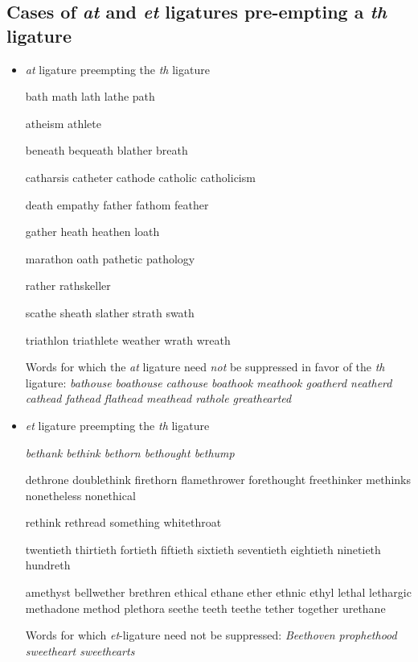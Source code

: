 \subsection*{Cases of \emph{at} and \emph{et} ligatures pre-empting a \emph{th} ligature}

\begin{itemize}
\item \emph{at} ligature preempting the \emph{th} ligature

\bgroup \em

bath math lath lathe path 

atheism athlete 

beneath bequeath blather breath 

catharsis catheter cathode catholic catholicism

death empathy father fathom feather 

gather heath heathen loath

marathon oath pathetic pathology

rather rathskeller

scathe sheath slather strath swath 

triathlon triathlete weather wrath wreath 

\egroup
\medskip
Words for which the \emph{at} ligature need \emph{not} be suppressed in favor of the \emph{th} ligature:
\emph{bathouse boathouse cathouse boathook meathook goatherd neatherd cathead fathead flathead meathead rathole greathearted}



\item \emph{et} ligature preempting the \emph{th} ligature

\bgroup \em
bethank bethink bethorn bethought bethump 

dethrone doublethink firethorn flamethrower forethought freethinker methinks nonetheless nonethical 

rethink rethread something whitethroat

twentieth thirtieth fortieth fiftieth sixtieth seventieth eightieth ninetieth hundreth 

amethyst bellwether brethren ethical ethane ether ethnic ethyl lethal lethargic methadone method plethora seethe teeth teethe tether together urethane 

\egroup
\medskip
Words for which \emph{et}-ligature need not be suppressed:
\emph{Beethoven prophethood sweetheart sweethearts}

\end{itemize}


